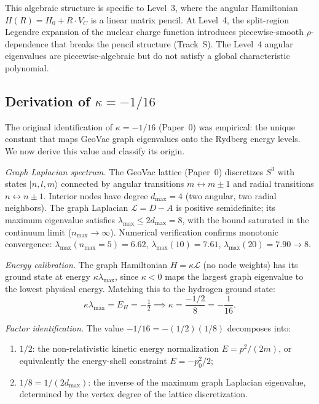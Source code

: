 \documentclass[aps,pra,twocolumn,superscriptaddress,longbibliography]{revtex4-2}
\begin{document}
This algebraic structure is specific to Level~3, where the angular
Hamiltonian $H(R) = H_0 + R \cdot V_C$ is a linear matrix pencil.
At Level~4, the split-region Legendre expansion of the nuclear charge
function introduces piecewise-smooth $\rho$-dependence that breaks
the pencil structure (Track~S).  The Level~4 angular eigenvalues
are piecewise-algebraic but do not satisfy a global characteristic
polynomial.

\subsection{Derivation of $\kappa = -1/16$}
\label{sec:kappa_derivation}

The original identification of $\kappa = -1/16$ (Paper~0) was
empirical: the unique constant that maps GeoVac graph eigenvalues
onto the Rydberg energy levels.  We now derive this value and
classify its origin.

\textit{Graph Laplacian spectrum.}  The GeoVac lattice
(Paper~0) discretizes $S^3$ with states $|n,l,m\rangle$
connected by angular transitions $m \leftrightarrow m \pm 1$
and radial transitions $n \leftrightarrow n \pm 1$.  Interior
nodes have degree $d_{\max} = 4$ (two angular, two radial
neighbors).  The graph Laplacian $\mathcal{L} = D - A$ is
positive semidefinite; its maximum eigenvalue satisfies
$\lambda_{\max} \leq 2 d_{\max} = 8$, with the bound saturated
in the continuum limit ($n_{\max} \to \infty$).  Numerical
verification confirms monotonic convergence:
$\lambda_{\max}(n_{\max}{=}5) = 6.62$,
$\lambda_{\max}(10) = 7.61$,
$\lambda_{\max}(20) = 7.90 \to 8$.

\textit{Energy calibration.}  The graph Hamiltonian
$H = \kappa \mathcal{L}$ (no node weights) has its ground
state at energy $\kappa \lambda_{\max}$, since $\kappa < 0$
maps the largest graph eigenvalue to the lowest physical energy.
Matching this to the hydrogen ground state:
\begin{equation}
  \kappa \lambda_{\max} = E_H = -\tfrac{1}{2}
  \implies
  \kappa = \frac{-1/2}{8} = -\frac{1}{16}.
  \label{eq:kappa_derived}
\end{equation}

\textit{Factor identification.}  The value $-1/16 = -(1/2)(1/8)$
decomposes into:
\begin{enumerate}
  \item $1/2$: the non-relativistic kinetic energy normalization
    $E = p^2/(2m)$, or equivalently the energy-shell constraint
    $E = -p_0^2/2$;
  \item $1/8 = 1/(2 d_{\max})$: the inverse of the maximum
    graph Laplacian eigenvalue, determined by the vertex degree
    of the lattice discretization.
\end{enumerate}
\end{document}
